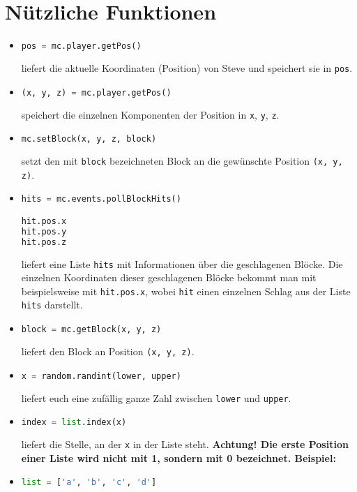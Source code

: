 \documentclass{article}
\begin{document}
	\section{Nützliche Funktionen}
	\begin{itemize}
		\item[] \begin{lstlisting}[language=Python]
pos = mc.player.getPos()
		\end{lstlisting}
		liefert die aktuelle Koordinaten (Position) von Steve und speichert sie in \texttt{pos}.
		\item[] \begin{lstlisting}[language=Python]
(x, y, z) = mc.player.getPos()
		\end{lstlisting}
		speichert die einzelnen Komponenten der Position in \texttt{x}, \texttt{y}, \texttt{z}.
		\item[] \begin{lstlisting}[language=Python]
mc.setBlock(x, y, z, block)
		\end{lstlisting}
		setzt den mit \texttt{block} bezeichneten Block an die gewünschte Position \texttt{(x, y, z)}.
		
		\item[] \begin{lstlisting}[language=Python]
hits = mc.events.pollBlockHits()

hit.pos.x
hit.pos.y
hit.pos.z
		\end{lstlisting}
		liefert eine Liste \texttt{hits} mit Informationen über die geschlagenen Blöcke. Die einzelnen Koordinaten dieser geschlagenen Blöcke bekommt man mit beispielsweise mit \texttt{hit.pos.x}, wobei \texttt{hit} einen einzelnen Schlag aus der Liste \texttt{hits} darstellt.
		
		\item[] \begin{lstlisting}[language=Python]
block = mc.getBlock(x, y, z)
		\end{lstlisting}
		liefert den Block an Position \texttt{(x, y, z)}.
		
		\item[] \begin{lstlisting}[language=Python]
x = random.randint(lower, upper)
		\end{lstlisting}
		liefert euch eine zufällig ganze Zahl zwischen \texttt{lower} und \texttt{upper}.
		
		\item[] \begin{lstlisting}[language=Python]
index = list.index(x)
		\end{lstlisting}
		liefert die Stelle, an der \texttt{x} in der Liste steht. \textbf{Achtung! Die erste Position einer Liste wird nicht mit 1, sondern mit 0 bezeichnet. Beispiel:}
		\item[] \begin{lstlisting}[language=Python]
list = ['a', 'b', 'c', 'd']
		

\end{lstlisting}
\end{itemize}
\end{document}

